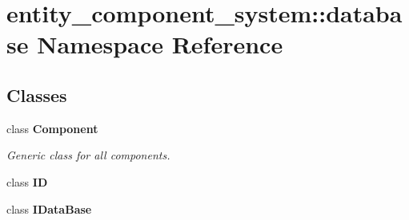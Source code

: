 \section{entity\+\_\+component\+\_\+system\+:\+:database Namespace Reference}
\label{namespaceentity__component__system_1_1database}
\subsection*{Classes}
\begin{DoxyCompactItemize}
\item 
class {\bf Component}
\begin{DoxyCompactList}\small\item\em Generic class for all components. \end{DoxyCompactList}\item 
class {\bf ID}
\item 
class {\bf I\+Data\+Base}
\end{DoxyCompactItemize}
